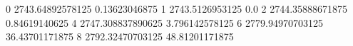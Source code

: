 0 2743.64892578125 0.13623046875
1 2743.5126953125 0.0
2 2744.35888671875 0.84619140625
4 2747.308837890625 3.796142578125
6 2779.94970703125 36.43701171875
8 2792.32470703125 48.81201171875
